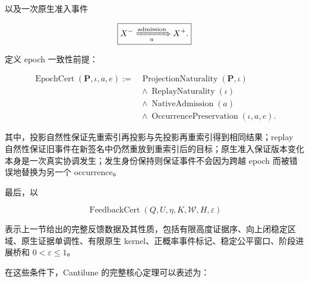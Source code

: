     以及一次原生准入事件

    \begin{equation}
    \boxed{
      X^-\xRightarrow[a]{\mathrm{admission}}X^+.}
      \label{eq:core-native-admission-event}
    \end{equation}

    定义 epoch 一致性前提：

    \begin{equation}
      \boxed{
        \begin{aligned}
          \operatorname{EpochCert}
          (\mathbf P,\iota,a,e)
          :={}&
          \operatorname{ProjectionNaturality}
          (\mathbf P,\iota)
          \\
          &{}\land
          \operatorname{ReplayNaturality}(\iota)
          \\
          &{}\land
          \operatorname{NativeAdmission}(a)
          \\
          &{}\land
          \operatorname{OccurrencePreservation}
          (\iota,a,e).
        \end{aligned}
      }
      \label{eq:core-epoch-certificate}
    \end{equation}

    其中，投影自然性保证先重索引再投影与先投影再重索引得到相同结果；replay 自然性保证旧事件在新签名中仍然重放到重索引后的目标；原生准入保证版本变化本身是一次真实协调发生；发生身份保持则保证事件不会因为跨越 epoch 而被错误地替换为另一个 occurrence。

    最后，以

    \begin{equation}
      \boxed{
        \operatorname{FeedbackCert}
        (Q,U,\eta,K,\mathcal W,H,\varepsilon)
      }
      \label{eq:core-feedback-certificate}
    \end{equation}

    表示上一节给出的完整反馈数据及其性质，包括有限高度证据序、向上闭稳定区域、原生证据单调性、有限原生 kernel、正概率事件标记、稳定公平窗口、阶段进展桥和 $0<\varepsilon\le1$。

    在这些条件下，Cantilune 的完整核心定理可以表述为：

